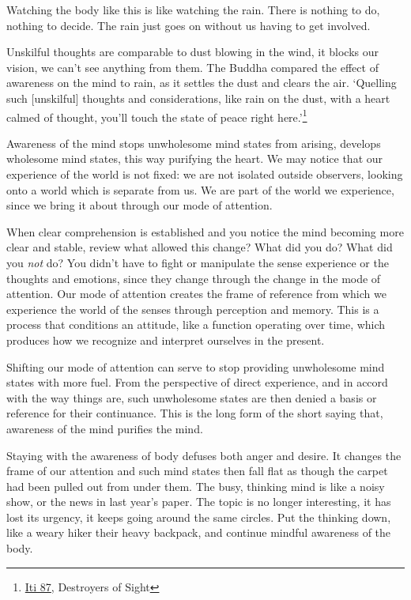 \enlargethispage*{\baselineskip}

Watching the body like this is like watching the rain. There is nothing
to do, nothing to decide. The rain just goes on without us having to get
involved.

\clearpage


Unskilful thoughts are comparable to dust blowing in the wind, it blocks
our vision, we can't see anything from them. The Buddha compared the
effect of awareness on the mind to rain, as it settles the dust and
clears the air. `Quelling such {[}unskilful{]} thoughts and
considerations, like rain on the dust, with a heart calmed of thought,
you'll touch the state of peace right here.'\footnote{\href{https://suttacentral.net/iti87/en/sujato}{Iti
  87}, Destroyers of Sight}

Awareness of the mind stops unwholesome mind states from arising,
develops wholesome mind states, this way purifying the heart. We may
notice that our experience of the world is not fixed: we are not
isolated outside observers, looking onto a world which is separate from
us. We are part of the world we experience, since we bring it about
through our mode of attention.

When clear comprehension is established and you notice the mind becoming
more clear and stable, review what allowed this change? What did you do?
What did you \emph{not} do? You didn't have to fight or manipulate the
sense experience or the thoughts and emotions, since they change through
the change in the mode of attention. Our mode of attention creates the
frame of reference from which we experience the world of the senses
through perception and memory. This is a process that conditions an
attitude, like a function operating over time, which produces how we
recognize and interpret ourselves in the present.

\clearpage

Shifting our mode of attention can serve to stop providing unwholesome
mind states with more fuel. From the perspective of direct experience,
and in accord with the way things are, such unwholesome states are then
denied a basis or reference for their continuance. This is the long form
of the short saying that, awareness of the mind purifies the mind.

Staying with the awareness of body defuses both anger and desire. It
changes the frame of our attention and such mind states then fall flat
as though the carpet had been pulled out from under them. The busy,
thinking mind is like a noisy show, or the news in last year's paper.
The topic is no longer interesting, it has lost its urgency, it keeps
going around the same circles. Put the thinking down, like a weary hiker
their heavy backpack, and continue mindful awareness of the body.

